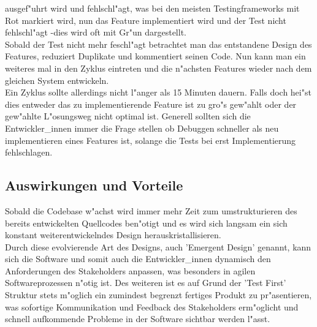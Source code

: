     ausgef"uhrt wird und fehlschl"agt, was bei den meisten Testingframeworks mit 
    Rot markiert wird, nun das Feature implementiert wird und der Test nicht 
    fehlschl"agt -dies wird oft mit Gr"un dargestellt.\\
    Sobald der Test nicht mehr feschl"agt betrachtet man das entstandene Design 
    des Features, reduziert Duplikate und kommentiert seinen Code. Nun kann man 
    ein weiteres mal in den Zyklus eintreten und die n"achsten Features wieder 
    nach dem gleichen System entwickeln.\\
    Ein Zyklus sollte allerdings nicht l"anger als 15 Minuten dauern. Falls doch
    hei"st dies entweder das zu implementierende Feature ist zu gro"s gew"ahlt
    oder der gew"ahlte L"osungsweg nicht optimal ist. Generell 
    sollten sich die Entwickler\_innen immer die Frage stellen ob Debuggen 
    schneller als neu implementieren eines Features ist, solange die Tests bei erst
    Implementierung fehlschlagen.

  \subsection{Auswirkungen und Vorteile}
    Sobald die Codebase w"achst wird immer mehr Zeit zum umstrukturieren des 
    bereits entwickelten Quellcodes ben"otigt und es wird sich langsam ein 
    sich konstant weiterentwickelndes Design herauskristallisieren.\\
    Durch diese evolvierende Art des Designs, auch 'Emergent Design'\cite[p.~4]{Chelimsky:2010} genannt, kann sich die Software und somit auch die 
    Entwickler\_innen dynamisch den Anforderungen des Stakeholders anpassen, was 
    besonders in agilen Softwareprozessen n"otig ist. Des weiteren ist es auf 
    Grund der 'Test First' Struktur stets m"oglich ein zumindest begrenzt 
    fertiges Produkt zu pr"asentieren, was sofortige Kommunikation und Feedback
    des Stakeholders erm"oglicht und schnell aufkommende Probleme in der Software
    sichtbar werden l"asst.\\

